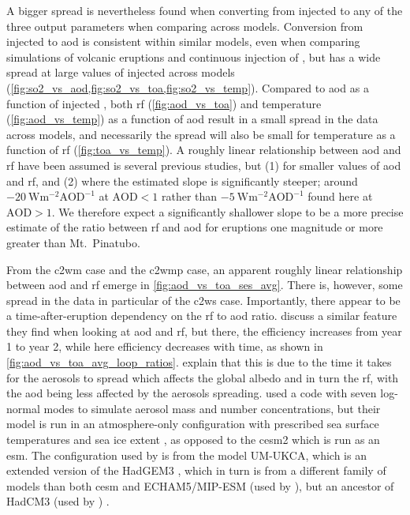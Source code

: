\documentclass{ametsocV5}
\newcommand{\iso}[1][i]{{#1}njected \ce{SO2}}
\begin{document}
A bigger spread is nevertheless found when converting from \iso{} to any of the three
output parameters when comparing across models. Conversion from \iso{} to \ac{aod} is
consistent within similar models, even when comparing simulations of volcanic eruptions
\citep{timmreck2010} and continuous injection of  \citep{niemeier2015}, but has
a wide spread at large values of \iso{} across models
(\cref{fig:so2_vs_aod,fig:so2_vs_toa,fig:so2_vs_temp}). Compared to \ac{aod} as a
function of \iso{}, both \ac{rf} (\cref{fig:aod_vs_toa}) and temperature
(\cref{fig:aod_vs_temp}) as a function of \ac{aod} result in a small spread in the data
across models, and necessarily the spread will also be small for temperature as a
function of \ac{rf} (\cref{fig:toa_vs_temp}). A roughly linear relationship between
\ac{aod} and \ac{rf} have been assumed is several previous studies, but (1) for smaller
values of \ac{aod} and \ac{rf}, and (2) where the estimated slope is significantly
steeper; around \(\SI{-20}{\watt\metre^{-2}\mathrm{AOD}^{-1}}\) at \(\mathrm{AOD}<1\)
rather than \(\SI{-5}{\watt\metre^{-2}\mathrm{AOD}^{-1}}\) found here at
\(\mathrm{AOD}>1\). We therefore expect a significantly shallower slope to be a more
precise estimate of the ratio between \ac{rf} and \ac{aod} for eruptions one magnitude
or more greater than Mt.\ Pinatubo.

From the \ac{c2wm} case and the \ac{c2wmp} case, an apparent roughly linear relationship
between \ac{aod} and \ac{rf} emerge in \cref{fig:aod_vs_toa_ses_avg}. There is, however,
some spread in the data in particular of the \ac{c2ws} case. Importantly, there appear
to be a time-after-eruption dependency on the \ac{rf} to \ac{aod} ratio.
\citet{marshall2020} discuss a similar feature they find when looking at \ac{aod} and
\ac{rf}, but there, the efficiency increases from year 1 to year 2, while here
efficiency decreases with time, as shown in \cref{fig:aod_vs_toa_avg_loop_ratios}.
\citet{marshall2020} explain that this is due to the time it takes for the aerosols to
spread which affects the global albedo and in turn the \ac{rf}, with the \ac{aod} being
less affected by the aerosols spreading. \citet{marshall2019, marshall2020,
  marshall2021} used a code with seven log-normal modes to simulate aerosol mass and
number concentrations, but their model is run in an atmosphere-only configuration with
prescribed sea surface temperatures and sea ice extent \citep{marshall2019}, as opposed
to the \ac{cesm2} which is run as an \ac{esm}. The configuration used by
\citet{marshall2019} is from the model UM-UKCA, which is an extended version of the
HadGEM3 \citep{dhomse2014}, which in turn is from a different family of models than both
\ac{cesm} and ECHAM5/MIP-ESM (used by \citet{timmreck2010,niemeier2015}), but an
ancestor of HadCM3 (used by \citet{gregory2016}) \citep{kuma2023}.
\end{document}
